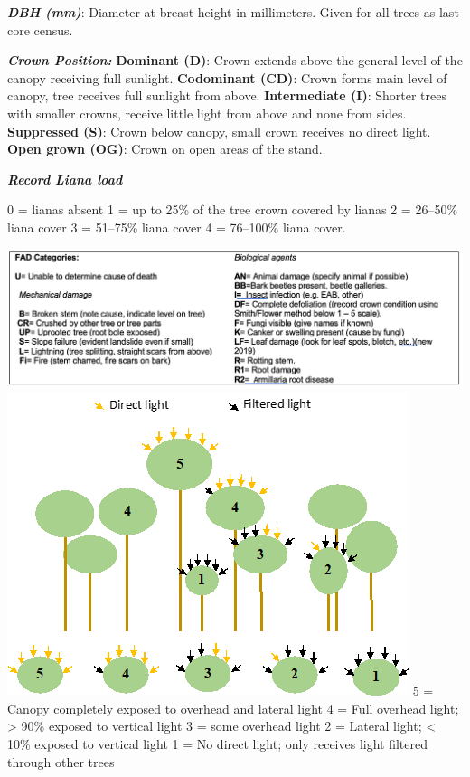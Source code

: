 \documentclass[
]{article}
\begin{document}
\textbf{\emph{DBH (mm)}}: Diameter at breast height in millimeters.
Given for all trees as last core census.

\textbf{\emph{Crown Position:}} \textbf{Dominant (D)}: Crown extends
above the general level of the canopy receiving full sunlight.
\textbf{Codominant (CD)}: Crown forms main level of canopy, tree
receives full sunlight from above. \textbf{Intermediate (I)}: Shorter
trees with smaller crowns, receive little light from above and none from
sides. \textbf{Suppressed (S)}: Crown below canopy, small crown receives
no direct light. \textbf{Open grown (OG)}: Crown on open areas of the
stand.

\textbf{\emph{Record Liana load}}

0 = lianas absent 1 = up to 25\% of the tree crown covered by lianas 2 =
26--50\% liana cover 3 = 51--75\% liana cover 4 = 76--100\% liana cover.

\includegraphics{figures_tables/FAD table.png}
\includegraphics{figures_tables/Crown_illumination.png} 5 = Canopy
completely exposed to overhead and lateral light 4 = Full overhead
light; \textgreater{} 90\% exposed to vertical light 3 = some overhead
light 2 = Lateral light; \textless{} 10\% exposed to vertical light 1 =
No direct light; only receives light filtered through other trees
\end{document}
